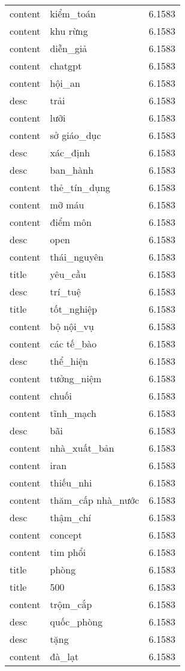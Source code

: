 \documentclass{article}
\begin{document}
\begin{tabular}{lll}
content & kiểm\_toán & 6.1583\\
content & khu rừng & 6.1583\\
content & diễn\_giả & 6.1583\\
content & chatgpt & 6.1583\\
content & hội\_an & 6.1583\\
desc & trải & 6.1583\\
content & lưỡi & 6.1583\\
content & sở giáo\_dục & 6.1583\\
desc & xác\_định & 6.1583\\
desc & ban\_hành & 6.1583\\
content & thẻ\_tín\_dụng & 6.1583\\
content & mỡ máu & 6.1583\\
content & điểm môn & 6.1583\\
desc & open & 6.1583\\
content & thái\_nguyên & 6.1583\\
title & yêu\_cầu & 6.1583\\
desc & trí\_tuệ & 6.1583\\
title & tốt\_nghiệp & 6.1583\\
content & bộ nội\_vụ & 6.1583\\
content & các tế\_bào & 6.1583\\
desc & thể\_hiện & 6.1583\\
content & tưởng\_niệm & 6.1583\\
content & chuối & 6.1583\\
content & tĩnh\_mạch & 6.1583\\
desc & bãi & 6.1583\\
content & nhà\_xuất\_bản & 6.1583\\
content & iran & 6.1583\\
content & thiếu\_nhi & 6.1583\\
content & thăm\_cấp nhà\_nước & 6.1583\\
desc & thậm\_chí & 6.1583\\
content & concept & 6.1583\\
content & tim phổi & 6.1583\\
title & phòng & 6.1583\\
title & 500 & 6.1583\\
content & trộm\_cắp & 6.1583\\
desc & quốc\_phòng & 6.1583\\
desc & tặng & 6.1583\\
content & đà\_lạt & 6.1583\\

\end{tabular}
\end{document}
